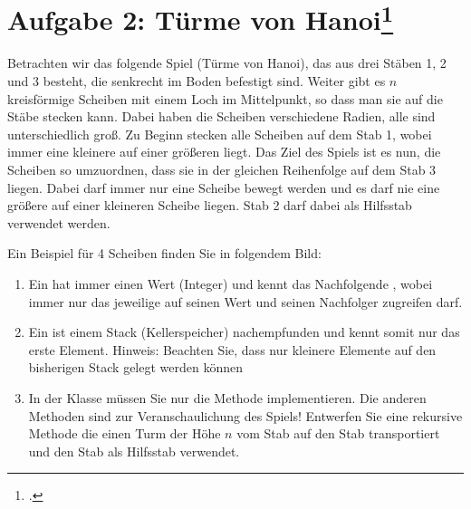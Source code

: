 \documentclass{lehramt-informatik}
\begin{document}
%

\section{Aufgabe 2: Türme von Hanoi\footcite{aud:ab:7}}

Betrachten wir das folgende Spiel (Türme von Hanoi), das aus drei Stäben
1, 2 und 3 besteht, die senkrecht im Boden befestigt sind. Weiter gibt
es $n$ kreisförmige Scheiben mit einem Loch im Mittelpunkt, so dass man
sie auf die Stäbe stecken kann. Dabei haben die Scheiben verschiedene
Radien, alle sind unterschiedlich groß. Zu Beginn stecken alle Scheiben
auf dem Stab 1, wobei immer eine kleinere auf einer größeren liegt. Das
Ziel des Spiels ist es nun, die Scheiben so umzuordnen, dass sie in der
gleichen Reihenfolge auf dem Stab 3 liegen. Dabei darf immer nur eine
Scheibe bewegt werden und es darf nie eine größere auf einer kleineren
Scheibe liegen. Stab 2 darf dabei als Hilfsstab verwendet werden.

Ein Beispiel für 4 Scheiben finden Sie in folgendem Bild:

\begin{enumerate}


\item Ein  hat immer einen Wert (Integer) und kennt das
Nachfolgende , wobei immer nur das jeweilige
 auf seinen Wert und seinen Nachfolger zugreifen darf.

\begin{antwort}
\end{antwort}


\item Ein  ist einem Stack (Kellerspeicher) nachempfunden und
kennt somit nur das erste Element. Hinweis: Beachten Sie, dass nur
kleinere Elemente auf den bisherigen Stack gelegt werden können

\begin{antwort}
\end{antwort}


\item In der Klasse  müssen Sie nur die Methode  implementieren.
Die anderen Methoden sind zur Veranschaulichung des Spiels! Entwerfen
Sie eine rekursive Methode die einen Turm der Höhe $n$ vom Stab
 auf den Stab  transportiert und den Stab
 als Hilfsstab verwendet.

\begin{antwort}
\end{antwort}

\end{enumerate}

\literatur
\end{document}
